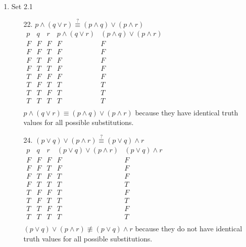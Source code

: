 \documentclass{article}
\begin{document}
\begin{enumerate}
\begin{enumerate}
			\item Set 2.1 
			\begin{itemize}
				\item [22.]
				$p \wedge  \left( q \vee r \right) \stackrel{?}{\equiv} \left( p \wedge q \right) \vee \left( p \wedge r \right)$ \\
				$\begin{array}{c|c|c|c|c}
					p & q & r & p \wedge  \left( q \vee r \right) & \left( p \wedge q \right) \vee \left( p \wedge r \right) \\ \hline
					F & F & F & F & F \\ \hline
					F & F & T & F & F \\ \hline
					F & T & F & F & F \\ \hline
					F & T & T & F & F \\ \hline
					T & F & F & F & F \\ \hline
					T & F & T & T & T \\ \hline
					T & T & F & T & T \\ \hline
					T & T & T & T & T \\ 
				\end{array}$ \\
				$p \wedge \left( q \vee r \right) \equiv \left( p \wedge q \right) \vee \left( p \wedge r \right)$ because they have identical truth values for all possible substitutions.
				\item [24.]
				$\left( p \vee q \right) \vee \left( p \wedge r \right) \stackrel{?}{\equiv} \left( p \vee q \right) \wedge r$ \\
				$\begin{array}{c|c|c|c|c}
					p & q & r & \left( p \vee q \right) \vee \left( p \wedge r \right) & \left( p \vee q \right) \wedge r \\ \hline
					F & F & F & F & F \\ \hline
					F & F & T & F & F \\ \hline
					F & T & F & T & F \\ \hline
					F & T & T & T & T \\ \hline
					T & F & F & T & F \\ \hline
					T & F & T & T & T \\ \hline
					T & T & F & T & F \\ \hline
					T & T & T & T & T \\ 
				\end{array}$ \\
				$\left( p \vee q \right) \vee \left( p \wedge r \right) \not\equiv \left( p \vee q \right) \wedge r$ because they do not have identical truth values for all possible substitutions.
			\end{itemize}
		

\end{enumerate}
\end{enumerate}
\end{document}
